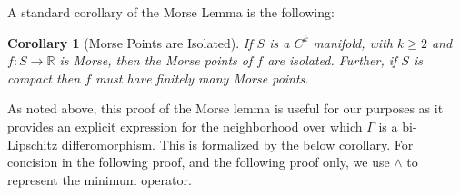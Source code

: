 \documentclass[11pt]{article}
\newcommand{\1}{\mathbf{1}}
\newtheorem{corr}{Corollary}%
\theoremstyle{definition}
\theoremstyle{remark}
\begin{document}
A standard corollary of the Morse Lemma is the following:

\begin{mdframed}
    \begin{corr}[Morse Points are Isolated]\label{corr:morse_isolated}
        If $S$ is a $C^k$ manifold, with $k\geq 2$ and $f:S \rightarrow \mathbb{R}$ is Morse, then the Morse points of $f$ are isolated. Further, if $S$ is compact then $f$ must have finitely many Morse points.
    \end{corr}
    \vspace*{0.3cm}
\end{mdframed}

\noindent
As noted above, this proof of the Morse lemma is useful for our purposes as it provides an explicit expression for the neighborhood over which $\Gamma$ is a bi-Lipschitz differomorphism. This is formalized by the below corollary. For concision in the following proof, and the following proof only, we use $\land$ to represent the minimum operator.
\end{document}
